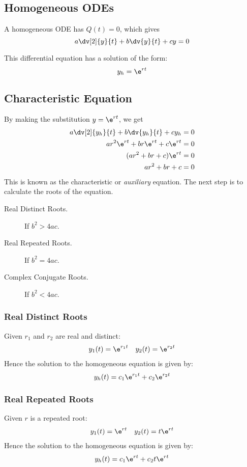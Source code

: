 \documentclass{article}
\begin{document}
\subsection{Homogeneous ODEs}
\begin{definition}
    A homogeneous ODE has $Q(t)=0$, which gives
    \begin{equation*}
        a \dv[2]{y}{t} + b \dv{y}{t} + c y = 0
    \end{equation*}
\end{definition}
This differential equation has a solution of the form:
\begin{equation*}
    y_h = \e^{rt}
\end{equation*}
\subsection{Characteristic Equation}
By making the substitution $y=\e^{rt}$, we get
\begin{align*}
    a \dv[2]{y_h}{t} + b \dv{y_h}{t} + c y_h & = 0 \\
    ar^2\e^{rt} + br\e^{rt} + c\e^{rt}       & = 0 \\
    (ar^2 + br + c)\e^{rt}                   & = 0 \\
    ar^2 + br + c                            & = 0
\end{align*}
This is known as the characteristic or \textit{auxiliary} equation. The next step is to calculate the roots of the equation.
\begin{description}
    \item[Real Distinct Roots.] If $b^2 > 4ac$.
    \item[Real Repeated Roots.] If $b^2 = 4ac$.
    \item[Complex Conjugate Roots.] If $b^2 < 4ac$.
\end{description}
\subsubsection{Real Distinct Roots}
Given $r_1$ and $r_2$ are real and distinct:
\begin{align*}
    y_1(t) = \e^{r_1t} &  & y_2(t) = \e^{r_2t}
\end{align*}
Hence the solution to the homogeneous equation is given by:
\begin{equation*}
    y_h(t) = c_1\e^{r_1t} + c_2\e^{r_2t}
\end{equation*}
\subsubsection{Real Repeated Roots}
Given $r$ is a repeated root:
\begin{align*}
    y_1(t) = \e^{rt} &  & y_2(t) = t\e^{rt}
\end{align*}
Hence the solution to the homogeneous equation is given by:
\begin{equation*}
    y_h(t) = c_1\e^{rt} + c_2t\e^{rt}
\end{equation*}
\end{document}
